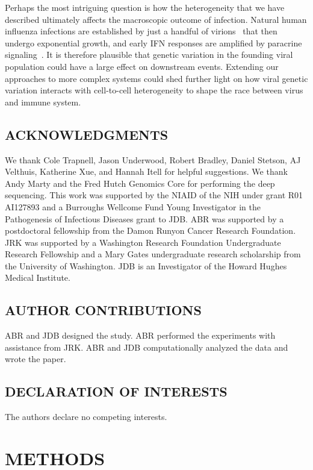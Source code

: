 \documentclass[10pt,letterpaper]{article}
\begin{document}
Perhaps the most intriguing question is how the heterogeneity that we have described ultimately affects the macroscopic outcome of infection.
Natural human influenza infections are established by just a handful of virions~\citep{mccrone2018stochastic, xue2018reconciling, varble2014influenza} that then undergo exponential growth, and early IFN responses are amplified by paracrine signaling~\citep{stetson2006type,honda2006type}.
It is therefore plausible that genetic variation in the founding viral population could have a large effect on downstream events.
Extending our approaches to more complex systems could shed further light on how viral genetic variation interacts with cell-to-cell heterogeneity to shape the race between virus and immune system.

\small
\subsection*{ACKNOWLEDGMENTS}
We thank Cole Trapnell, Jason Underwood, Robert Bradley, Daniel Stetson, AJ Velthuis, Katherine Xue, and Hannah Itell for helpful suggestions.
We thank Andy Marty and the Fred Hutch Genomics Core for performing the deep sequencing.
This work was supported by the NIAID of the NIH under grant R01 AI127893 and a Burroughs Wellcome Fund Young Investigator in the Pathogenesis of Infectious Diseases grant to JDB.
ABR was supported by a postdoctoral fellowship from the Damon Runyon Cancer Research Foundation.
JRK was supported by a Washington Research Foundation Undergraduate Research Fellowship and a Mary Gates undergraduate research scholarship from the University of Washington.
JDB is an Investigator of the Howard Hughes Medical Institute.

\subsection*{AUTHOR CONTRIBUTIONS}
ABR and JDB designed the study.
ABR performed the experiments with assistance from JRK.
ABR and JDB computationally analyzed the data and wrote the paper.

\subsection*{DECLARATION OF INTERESTS}
The authors declare no competing interests.



\section*{METHODS}
\end{document}
